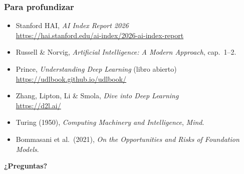 \documentclass[aspectratio=169, 10pt]{beamer}
\begin{document}
\begin{frame}
\frametitle{Para profundizar}
\begin{itemize}
	\item Stanford HAI, \emph{AI Index Report 2026}\\ \url{https://hai.stanford.edu/ai-index/2026-ai-index-report}
	\item Russell \& Norvig, \emph{Artificial Intelligence: A Modern Approach}, cap.~1--2.
	\item Prince, \emph{Understanding Deep Learning} (libro abierto)\\ \url{https://udlbook.github.io/udlbook/}
	\item Zhang, Lipton, Li \& Smola, \emph{Dive into Deep Learning}\\ \url{https://d2l.ai/}
	\item Turing (1950), \emph{Computing Machinery and Intelligence}, \emph{Mind}.
	\item Bommasani et al.\ (2021), \emph{On the Opportunities and Risks of Foundation Models}.
\end{itemize}
\vspace{0.8em}
\begin{center}
\Large \textbf{¿Preguntas?}
\end{center}
\end{frame}
\end{document}
